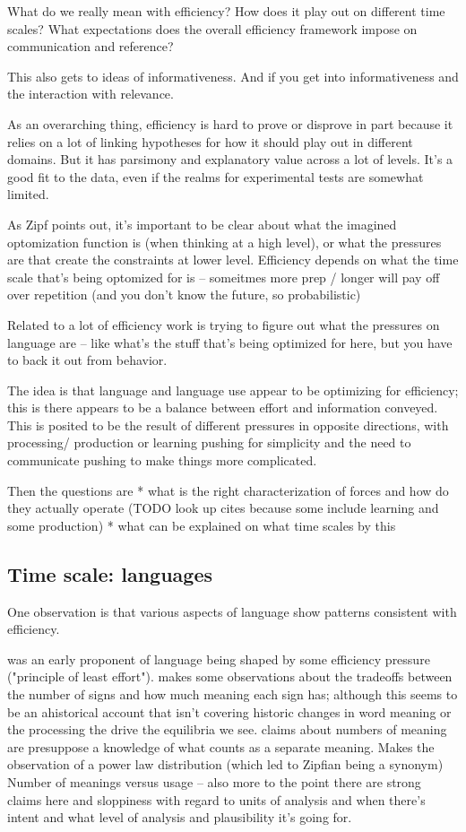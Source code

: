 \documentclass[]{article}
\begin{document}
What do we really mean with efficiency? How does it play out on different time scales? What expectations does the overall efficiency framework impose on communication and reference? 

This also gets to ideas of informativeness. And if you get into informativeness and the interaction with relevance. 


As an overarching thing, efficiency is hard to prove or disprove in part because it relies on a lot of linking hypotheses for how it should play out in different domains. But it has parsimony and explanatory value across a lot of levels. It's a good fit to the data, even if the realms for experimental tests are somewhat limited. 

As Zipf points out, it's important to be clear about what the imagined optomization function is (when thinking at a high level), or what the pressures are that create the constraints at lower level. Efficiency depends on what the time scale that's being optomized for is -- someitmes more prep / longer will pay off over repetition (and you don't know the future, so probabilistic)

Related to a lot of efficiency work is trying to figure out what the pressures on language are -- like what's the stuff that's being optimized for here, but you have to back it out from behavior. 

The idea is that language and language use appear to be optimizing for efficiency; this is there appears to be a balance between effort and information conveyed. This is posited to be the result of different pressures in opposite directions, with processing/ production or learning pushing for simplicity and the need to communicate pushing to make things more complicated. 

Then the questions are
* what is the right characterization of forces and how do they actually operate (TODO look up cites because some include learning and some production) 
* what can be explained on what time scales by this

\subsection{Time scale: languages}
One observation is that various aspects of language show patterns consistent with efficiency. 


\cite{zipf1949} was an early proponent of language being shaped by some efficiency pressure ("principle of least effort"). \cite{zipf1949} makes some observations about the tradeoffs between the number of signs and how much meaning each sign has; although this seems to be an ahistorical account that isn't covering historic changes in word meaning or the processing the drive the equilibria we see. claims about numbers of meaning are presuppose a knowledge of what counts as a separate meaning. Makes the observation of a power law distribution (which led to Zipfian being a synonym) Number of meanings versus usage -- also more to the point there are strong claims here and sloppiness with regard to units of analysis and when there's intent and what level of analysis and plausibility it's going for. 
\end{document}
